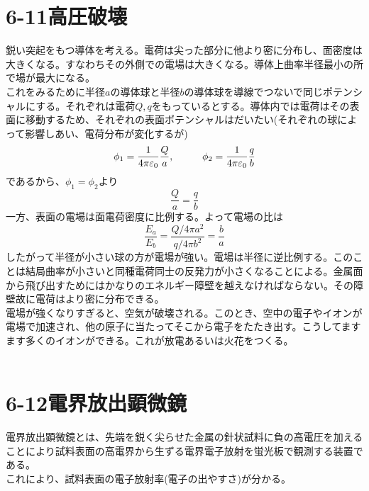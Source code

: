 \documentclass{jsarticle}
\begin{document}
\newpage
\section*{6-11\hspace{10mm}高圧破壊}
\noindent
鋭い突起をもつ導体を考える。電荷は尖った部分に他より密に分布し、面密度は大きくなる。すなわちその外側での電場は大きくなる。導体上曲率半径最小の所で場が最大になる。\\
これをみるために半径\(a\)の導体球と半径\(b\)の導体球を導線でつないで同じポテンシャルにする。それぞれは電荷\(Q,q\)をもっているとする。導体内では電荷はその表面に移動するため、それぞれの表面ポテンシャルはだいたい(それぞれの球によって影響しあい、電荷分布が変化するが)
\[\phi_{1}=\frac{1}{4\pi\varepsilon_{0}}\frac{Q}{a},\hspace{10mm}\phi_{2}=\frac{1}{4\pi\varepsilon_{0}}\frac{q}{b}\]
であるから、\(\phi_{1}=\phi_{2}\)より
\[\frac{Q}{a}=\frac{q}{b}\]
一方、表面の電場は面電荷密度に比例する。よって電場の比は
\begin{equation}
\frac{E_{a}}{E_{b}}=\frac{Q/4\pi a^{2}}{q/4\pi b^{2}}=\frac{b}{a}
\end{equation}
したがって半径が小さい球の方が電場が強い。電場は半径に逆比例する。このことは結局曲率が小さいと同種電荷同士の反発力が小さくなることによる。金属面から飛び出すためにはかなりのエネルギー障壁を越えなければならない。その障壁故に電荷はより密に分布できる。\\
電場が強くなりすぎると、空気が破壊される。このとき、空中の電子やイオンが電場で加速され、他の原子に当たってそこから電子をたたき出す。こうしてますます多くのイオンができる。これが放電あるいは火花をつくる。\\
\\


\newpage
\section*{6-12\hspace{5mm}電界放出顕微鏡}
\noindent
電界放出顕微鏡とは、先端を鋭く尖らせた金属の針状試料に負の高電圧を加えることにより試料表面の高電界から生ずる電界電子放射を蛍光板で観測する装置である。\\
これにより、試料表面の電子放射率(電子の出やすさ)が分かる。
\end{document}
